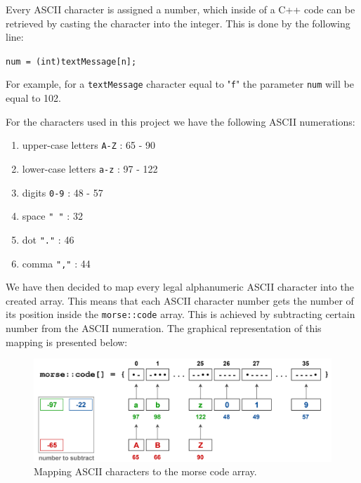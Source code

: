 \documentclass[12pt]{report}
\begin{document}
Every ASCII character is assigned a number, which inside of a C++ code can be retrieved by casting the character into the integer. This is done by the following line: 

\begin{snugshade}
\verb|num = (int)textMessage[n];|
\end{snugshade}

For example, for a \verb|textMessage| character equal to "\verb|f|" the parameter \verb|num| will be equal to 102.

For the characters used in this project we have the following ASCII numerations:


\begin{enumerate}

\item upper-case letters \verb|A-Z| : 65 - 90

\item lower-case letters \verb|a-z| : 97 - 122

\item digits \verb|0-9| : 48 - 57

\item space \verb|" "| : 32

\item dot \verb|"."| : 46

\item comma \verb|","| : 44

\end{enumerate}


We have then decided to map every legal alphanumeric ASCII character into the created array. This means that each ASCII character number gets the number of its position inside the \verb|morse::code| array. This is achieved by subtracting certain number from the ASCII numeration. The graphical representation of this mapping is presented below:

\begin{figure}[H]
\centering\includegraphics[scale=0.1]{morse_code_map}
\caption{Mapping ASCII characters to the morse code array.}				
\label{fig:morse_code_map}
\end{figure}
\end{document}

